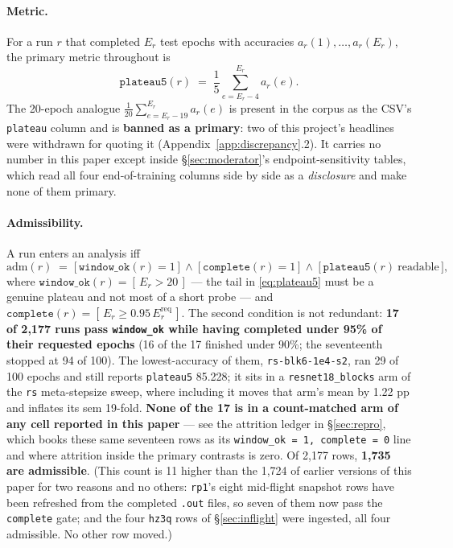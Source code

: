 \documentclass[10pt,letterpaper]{article}
\newcommand{\plateau}{\texttt{plateau5}}
\newcommand{\arm}[1]{\texttt{#1}}
\begin{document}
\paragraph{Metric.}
For a run $r$ that completed $E_r$ test epochs with accuracies $a_r(1),\dots,a_r(E_r)$, the
primary metric throughout is
\begin{equation}
\plateau(r)\;=\;\frac{1}{5}\sum_{e=E_r-4}^{E_r} a_r(e).
\label{eq:plateau5}
\end{equation}
The 20-epoch analogue $\frac{1}{20}\sum_{e=E_r-19}^{E_r} a_r(e)$ is present in the corpus as the
CSV's \texttt{plateau} column and is \textbf{banned as a primary}: two of this project's
headlines were withdrawn for quoting it (Appendix~\ref{app:discrepancy}.2). It carries no
number in this paper except inside \S\ref{sec:moderator}'s endpoint-sensitivity tables, which
read all four end-of-training columns side by side as a \emph{disclosure} and make none of them
primary.

\paragraph{Admissibility.}
A run enters an analysis iff
\begin{equation}
\mathrm{adm}(r)\;=\;\big[\,\texttt{window\_ok}(r)=1\,\big]\ \wedge\
\big[\,\texttt{complete}(r)=1\,\big]\ \wedge\
\big[\,\plateau(r)\ \text{readable}\,\big],
\label{eq:adm}
\end{equation}
where $\texttt{window\_ok}(r) = [\,E_r > 20\,]$ --- the tail in \eqref{eq:plateau5} must be a
genuine plateau and not most of a short probe --- and
$\texttt{complete}(r) = [\,E_r \ge 0.95\,E^{\mathrm{req}}_r\,]$. The second condition is not
redundant: \textbf{17 of 2{,}177 runs pass \texttt{window\_ok} while having completed under 95\%
of their requested epochs} (16 of the 17 finished under 90\%; the seventeenth stopped at 94 of
100). The lowest-accuracy of them, \arm{rs-blk6-1e4-s2}, ran 29 of 100 epochs and still reports
\plateau{} 85.228; it sits in a \arm{resnet18\_blocks} arm of the \arm{rs} meta-stepsize sweep,
where including it moves that arm's mean by 1.22 pp and inflates its sem 19-fold. \textbf{None of
the 17 is in a count-matched arm of any cell reported in this paper} --- see
the attrition ledger in \S\ref{sec:repro}, which books these same seventeen rows as its
\texttt{window\_ok = 1, complete = 0} line and where attrition
inside the primary contrasts is zero. Of 2{,}177 rows, \textbf{1{,}735 are admissible}.
(This count is 11 higher than the 1{,}724 of earlier versions of this paper for two reasons and no
others: \arm{rp1}'s eight mid-flight snapshot rows have been refreshed from the completed
\texttt{.out} files, so seven of them now pass the \texttt{complete} gate; and the four \arm{hz3q}
rows of \S\ref{sec:inflight} were ingested, all four admissible. No other row moved.)
\end{document}

